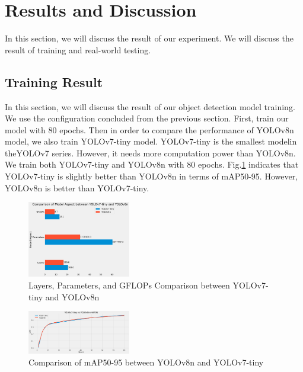 \documentclass[conference]{IEEEtran}
\begin{document}
\section{Results and Discussion}
In this section, we will discuss  the result of our experiment. We will discuss  the result of training and real-world testing.
\subsection{Training Result}
In this section, we will discuss the result of our object detection model training. We use the configuration concluded from the previous section. First, train our model with 80 epochs.
Then in order to compare the performance of YOLOv8n model, we also train YOLOv7-tiny model.
YOLOv7-tiny is the smallest modelin theYOLOv7 series. However, it needs more computation power than YOLOv8n. We train both YOLOv7-tiny and YOLOv8n with 80 epochs.
Fig.\ref{fig:mAP_comparison} indicates that YOLOv7-tiny is slightly better than YOLOv8n in terms of mAP50-95. However, YOLOv8n is better than YOLOv7-tiny.
\begin{figure}
\centering
\includegraphics[width=0.4\textwidth,keepaspectratio]{YOLOv7-tinyvsYOLOv8n_model_aspect.png}    
\caption{Layers, Parameters, and GFLOPs Comparison between YOLOv7-tiny and YOLOv8n}
\end{figure}

\begin{figure}[h]
\centering
\includegraphics[width=0.4\textwidth,keepaspectratio]{YOLOv7-tinyvsYOLOv8n.png}
\caption{Comparison of mAP50-95 between YOLOv8n and YOLOv7-tiny}
\label{fig:mAP_comparison}
\end{figure}
\end{document}
